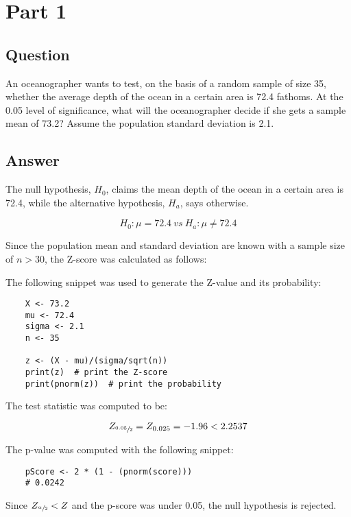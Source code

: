 \section{Part 1}
    \subsection{Question}
    An oceanographer wants to test, on the basis of a random sample of size 35, whether the average depth of the ocean in a certain area is 72.4 fathoms. At the 0.05 level of significance, what will the oceanographer decide if she gets a sample mean of 73.2? Assume the population standard deviation is 2.1.

    \subsection{Answer}
    The null hypothesis, $H_{0}$, claims the mean depth of the ocean in a certain area is 72.4, while the alternative hypothesis, $H_{a}$, says otherwise.

        \[ H_{0}: \mu = 72.4 \ vs \ H_{a}: \mu \neq 72.4 \]

    Since the population mean and standard deviation are known with a sample size of $n > 30$, the Z-score was calculated as follows:

        \newline

    The following snippet was used to generate the Z-value and its probability:
\begin{lstlisting}
    X <- 73.2
    mu <- 72.4
    sigma <- 2.1
    n <- 35

    z <- (X - mu)/(sigma/sqrt(n))
    print(z)  # print the Z-score
    print(pnorm(z))  # print the probability
\end{lstlisting}

    The test statistic was computed to be:

    \begin{equation*}
        Z_{\sfrac{0.05}{2}}=Z_{0.025}= -1.96 < 2.2537
    \end{equation*}

    The p-value was computed with the following snippet:
\begin{lstlisting}
    pScore <- 2 * (1 - (pnorm(score)))
    # 0.0242
\end{lstlisting}

    Since $Z_{\sfrac{\alpha}{2}} < Z$ and the p-score was under 0.05, the null hypothesis is rejected.
